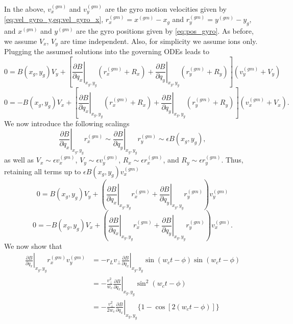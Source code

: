 \documentclass[oneside,a4paper,11pt]{report}
\begin{document}
In the above, $v_x^{(gm)}$ and $v_y^{(gm)}$ are the gyro motion velocities given by \cref{eq:vel_gyro_y,eq:vel_gyro_x}, $r_x^{(gm)} = x^{(gm)} - x_g$ and $r_y^{(gm)} = y^{(gm)} - y_g$, and $x^{(gm)}$ and $y^{(gm)}$ are the gyro positions given by \cref{eq:pos_gyro}. As before, we assume $V_x$, $V_y$ are time independent. Also, for simplicity we assume ions only. Plugging the assumed solutions into the governing ODEs leads to
\begin{equation}
    0 = B(x_g,y_g) V_y + \left [ \left . \frac{\partial B}{\partial q_x} \right|_{x_g,y_g} \left ( r^{(gm)}_x + R_x \right ) + \left . \frac{\partial B}{\partial q_y} \right |_{x_g,y_g} \left ( r^{(gm)}_y + R_y \right ) \right] \left ( v_y^{(gm)} + V_y \right)
\end{equation}
\begin{equation}
    0 = -B(x_g,y_g) V_x + \left [ \left . \frac{\partial B}{\partial q_x} \right|_{x_g,y_g} \left ( r^{(gm)}_x + R_x \right ) + \left . \frac{\partial B}{\partial q_y} \right |_{x_g,y_g} \left ( r^{(gm)}_y + R_y \right ) \right ] \left ( v_x^{(gm)} + V_x \right ).
\end{equation}
We now introduce the following scalings
\begin{equation}
    \left . \frac{\partial B}{\partial q_x} \right|_{x_g,y_g} r_x^{(gm)} \sim \left . \frac{\partial B}{\partial q_y} \right |_{x_g,y_g} r_y^{(gm)} \sim \epsilon B(x_g, y_g),
\end{equation}
as well as $V_x \sim \epsilon v_x^{(gm)}$, $V_y \sim \epsilon v_y^{(gm)}$, $R_x \sim \epsilon r_x^{(gm)}$, and $R_y \sim \epsilon r_y^{(gm)}$. Thus, retaining all terms up to $\epsilon B(x_g,y_g) v_x^{(gm)}$
\begin{equation}
\label{eq:gradB_temp1}
    0 = B(x_g,y_g) V_y + \left ( \left . \frac{\partial B}{\partial q_x} \right|_{x_g,y_g} r^{(gm)}_x + \left . \frac{\partial B}{\partial q_y} \right |_{x_g,y_g} r^{(gm)}_y \right ) v_y^{(gm)} 
\end{equation}
\begin{equation}
\label{eq:gradB_temp2}
    0 = -B(x_g,y_g) V_x + \left ( \left . \frac{\partial B}{\partial q_x} \right|_{x_g,y_g} r^{(gm)}_x + \left . \frac{\partial B}{\partial q_y} \right |_{x_g,y_g} r^{(gm)}_y \right ) v_x^{(gm)}.
\end{equation}
We now show that
\begin{align}
    \left . \frac{\partial B}{\partial q_x} \right|_{x_g,y_g} r_x^{(gm)} v_y^{(gm)} &= -r_L v_\perp \left . \frac{\partial B}{\partial q_x} \right |_{x_g,y_g} \sin (w_c t - \phi) \sin (w_ct - \phi)  \nonumber \\
    & = -\frac{ v^2_\perp}{w_c} \left . \frac{\partial B}{\partial q_x} \right |_{x_g,y_g} \sin^2(w_c t - \phi) \nonumber \\
    & = -\frac{ v^2_\perp}{2 w_c} \left . \frac{\partial B}{\partial q_x} \right |_{x_g,y_g} \{1 - \cos [ 2 (w_c t - \phi)] \}
\end{align}
\end{document}
